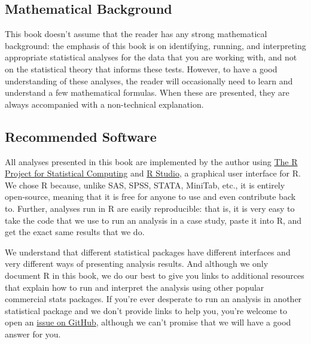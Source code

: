 \subsection{Mathematical Background}
This book doesn't assume that the reader has any strong mathematical background: the emphasis of this book is on identifying, running, and interpreting appropriate statistical analyses for the data that you are working with, and not on the statistical theory that informs these tests. However, to have a good understanding of these analyses, the reader will occasionally need to learn and understand a few mathematical formulas. When these are presented, they are always accompanied with a non-technical explanation.

\subsection{Recommended Software}
All analyses presented in this book are implemented by the author using \href{http://cran.r-project.org/mirrors.html}{The R Project for Statistical Computing} and \href{http://rstudio.com/}{R Studio}, a graphical user interface for R. We chose R because, unlike SAS, SPSS, STATA, MiniTab, etc., it is entirely open-source, meaning that it is free for anyone to use and even contribute back to. Further, analyses run in R are easily reproducible: that is, it is very easy to take the code that we use to run an analysis in a case study, paste it into R, and get the exact same results that we do.

We understand that different statistical packages have different interfaces and very different ways of presenting analysis results. And although we only document R in this book, we do our best to give you links to additional resources that explain how to run and interpret the analysis using other popular commercial stats packages. If you're ever desperate to run an analysis in another statistical package and we don't provide links to help you, you're welcome to open an \href{https://github.com/faulconbridge/appliedStats/issues}{issue on GitHub}, although we can't promise that we will have a good answer for you.

